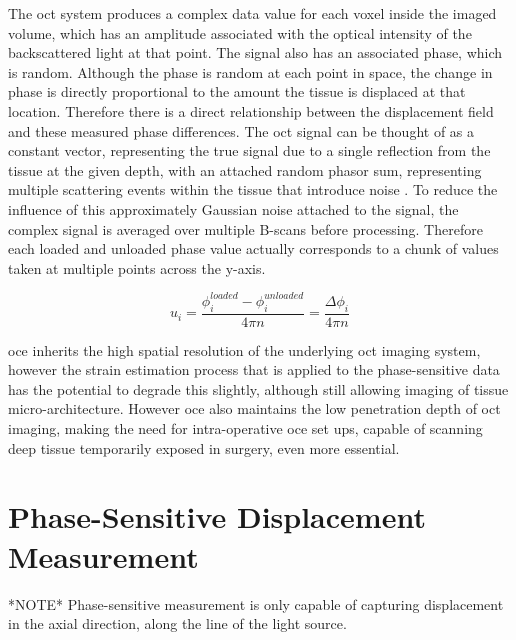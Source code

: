 The \ac{oct} system produces a complex data value for each voxel inside the imaged volume, which has an amplitude associated with the optical intensity of the backscattered light at that point. The signal also has an associated phase, which is random. Although the phase is random at each point in space, the change in phase is directly proportional to the amount the tissue is displaced at that location. Therefore there is a direct relationship between the displacement field and these measured phase differences.
The \ac{oct} signal can be thought of as a constant vector, representing the true signal due to a single reflection from the tissue at the given depth, with an attached random phasor sum, representing multiple scattering events within the tissue that introduce noise \cite{goodman_statistical_2015}. To reduce the influence of this approximately Gaussian noise attached to the signal, the complex signal is averaged over multiple B-scans before processing. Therefore each loaded and unloaded phase value actually corresponds to a chunk of values taken at multiple points across the y-axis. 

\begin{equation}
u_i = \frac{\phi_i^{loaded}-\phi_i^{unloaded}}{4\pi n} = \frac{\Delta\phi_i}{4\pi n}
\end{equation}

\ac{oce} inherits the high spatial resolution of the underlying \ac{oct} imaging system, however the strain estimation process that is applied to the phase-sensitive data has the potential to degrade this slightly, although still allowing imaging of tissue micro-architecture. However \ac{oce} also maintains the low penetration depth of \ac{oct} imaging, making the need for intra-operative \ac{oce} set ups, capable of scanning deep tissue temporarily exposed in surgery, even more essential. 

\section{Phase-Sensitive Displacement Measurement}\label{phase_sensitive}

*NOTE* Phase-sensitive measurement is only capable of capturing displacement in the axial direction, along the line of the light source. 


